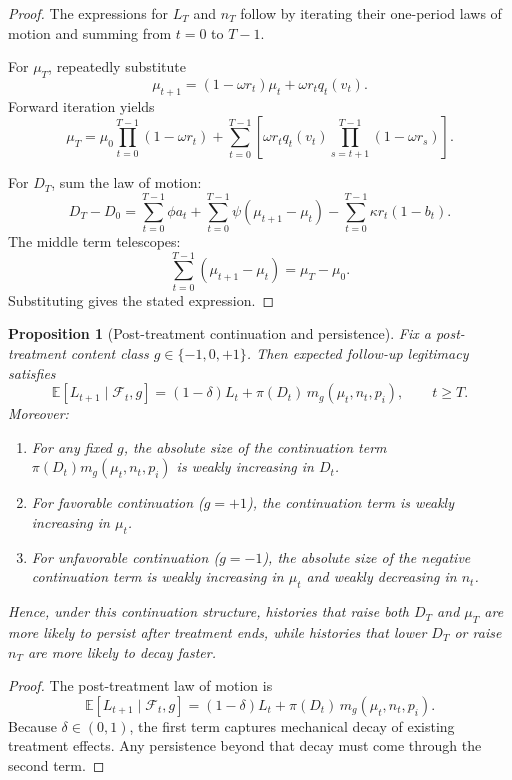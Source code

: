 \documentclass[12pt,american]{article}
\newtheorem{proposition}{Proposition}
\begin{document}
\begin{refsection}
		\begin{proof}
			The expressions for \(L_T\) and \(n_T\) follow by iterating their one-period laws of motion and summing from \(t=0\) to \(T-1\).
			
			For \(\mu_T\), repeatedly substitute
			\[
			\mu_{t+1}=(1-\omega r_t)\mu_t+\omega r_t q_t(v_t).
			\]
			Forward iteration yields
			\[
			\mu_T
			=
			\mu_0\prod_{t=0}^{T-1}(1-\omega r_t)
			+
			\sum_{t=0}^{T-1}
			\left[
			\omega r_t q_t(v_t)\prod_{s=t+1}^{T-1}(1-\omega r_s)
			\right].
			\]
			
			For \(D_T\), sum the law of motion:
			\[
			D_T-D_0
			=
			\sum_{t=0}^{T-1}\phi a_t
			+
			\sum_{t=0}^{T-1}\psi(\mu_{t+1}-\mu_t)
			-
			\sum_{t=0}^{T-1}\kappa r_t(1-b_t).
			\]
			The middle term telescopes:
			\[
			\sum_{t=0}^{T-1}(\mu_{t+1}-\mu_t)=\mu_T-\mu_0.
			\]
			Substituting gives the stated expression.
		\end{proof}
		
		\begin{proposition}[Post-treatment continuation and persistence]
			\label{prop:persistence_revised}
			Fix a post-treatment content class \(g\in\{-1,0,+1\}\). Then expected follow-up legitimacy satisfies
			\[
			\mathbb{E}[L_{t+1}\mid \mathcal F_t,g]=(1-\delta)L_t+\pi(D_t)\,m_g(\mu_t,n_t,p_i),
			\qquad t\ge T.
			\]
			Moreover:
			
			\begin{enumerate}
				\item For any fixed \(g\), the absolute size of the continuation term \(\pi(D_t)m_g(\mu_t,n_t,p_i)\) is weakly increasing in \(D_t\).
				
				\item For favorable continuation (\(g=+1\)), the continuation term is weakly increasing in \(\mu_t\).
				
				\item For unfavorable continuation (\(g=-1\)), the absolute size of the negative continuation term is weakly increasing in \(\mu_t\) and weakly decreasing in \(n_t\).
			\end{enumerate}
			
			Hence, under this continuation structure, histories that raise both \(D_T\) and \(\mu_T\) are more likely to persist after treatment ends, while histories that lower \(D_T\) or raise \(n_T\) are more likely to decay faster.
		\end{proposition}
		
		\begin{proof}
			The post-treatment law of motion is
			\[
			\mathbb{E}[L_{t+1}\mid \mathcal F_t,g]=(1-\delta)L_t+\pi(D_t)\,m_g(\mu_t,n_t,p_i).
			\]
			Because \(\delta\in(0,1)\), the first term captures mechanical decay of existing treatment effects. Any persistence beyond that decay must come through the second term.
			

\end{proof}
\end{refsection}
\end{document}
